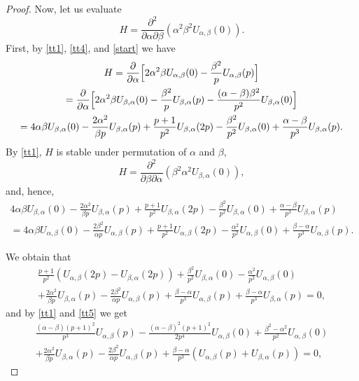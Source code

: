 \documentclass[12pt]{amsart}
\numberwithin{equation}{section}
\theoremstyle{plain}
\numberwithin{equation}{section}
\begin{document}
\begin{proof}
Now, let us evaluate 
$$
H=\frac{\partial^2}{\partial \alpha\partial \beta}(\alpha^2\beta^2 U_{\alpha,\beta}(0)).
$$
First, by \eqref{tt1}, \eqref{tt4}, and \eqref{start} we have
\begin{multline}
H=\frac{\partial}{\partial \alpha}\Bigl[ 2\alpha^2\beta U_{\alpha,\beta}(0) -\frac{\beta^2}p U_{\alpha,\beta}(p)\Bigr]\\=
\frac{\partial}{\partial \alpha}\Bigl[ 2\alpha^2\beta U_{\beta,\alpha}(0) -\frac{\beta^2}p U_{\beta,\alpha}(p)-\frac{(\alpha-\beta)\beta^2}{p^2}U_{\beta,\alpha}(0)\Bigr]\\=
4\alpha\beta U_{\beta,\alpha}(0)-\frac{2\alpha^2}{\beta p}U_{\beta,\alpha}(p)+\frac{p+1}{p^2} U_{\beta,\alpha}(2p)-\frac{\beta^2}{p^2}U_{\beta,\alpha}(0)+\frac{\alpha-\beta}{p^3}U_{\beta,\alpha}(p)\label{tttdif}.
\end{multline}
By \eqref{tt1}, $H$ is stable under permutation of $\alpha$ and $\beta$, 
$$
H=\frac{\partial^2}{\partial \beta\partial \alpha}(\beta^2\alpha^2 U_{\beta,\alpha}(0)),
$$
and, hence,
\begin{multline*}
4\alpha\beta U_{\beta,\alpha}(0)-\frac{2\alpha^2}{\beta p}U_{\beta,\alpha}(p)+\frac{p+1}{p^2} U_{\beta,\alpha}(2p)-\frac{\beta^2}{p^2}U_{\beta,\alpha}(0)+\frac{\alpha-\beta}{p^3}U_{\beta,\alpha}(p)\\=
4\alpha\beta U_{\alpha,\beta}(0)-\frac{2\beta^2}{\alpha p}U_{\alpha,\beta}(p)+\frac{p+1}{p^2} U_{\alpha,\beta}(2p)-\frac{\alpha^2}{p^2}U_{\alpha,\beta}(0)+\frac{\beta-\alpha}{p^3}U_{\alpha,\beta}(p).
\end{multline*}

We obtain that
\begin{multline*}
\frac{p+1}{p^2} (U_{\alpha,\beta}(2p)-U_{\beta,\alpha}(2p))+ \frac{\beta^2}{p^2}U_{\beta,\alpha}(0)-\frac{\alpha^2}{p^2}U_{\alpha,\beta}(0)\\
+\frac{2\alpha^2}{\beta p}U_{\beta,\alpha}(p)-\frac{2\beta^2}{\alpha p}U_{\alpha,\beta}(p)
+\frac{\beta-\alpha}{p^3}U_{\alpha,\beta}(p)
+\frac{\beta-\alpha}{p^3}U_{\beta,\alpha}(p)=0,
\end{multline*}
and by \eqref{tt1} and \eqref{tt5} we get
\begin{multline*}
\frac{(\alpha-\beta)(p+1)^2}{p^3} U_{\alpha,\beta}(p)-\frac{(\alpha-\beta)^2(p+1)^2}{2p^4}U_{\alpha,\beta}(0)+ \frac{\beta^2-\alpha^2}{p^2}U_{\alpha,\beta}(0)\\
+\frac{2\alpha^2}{\beta p}U_{\beta,\alpha}(p)-\frac{2\beta^2}{\alpha p}U_{\alpha,\beta}(p)
+\frac{\beta-\alpha}{p^3}(U_{\alpha,\beta}(p)
+U_{\beta,\alpha}(p))=0,
\end{multline*}


\end{proof}
\end{document}
